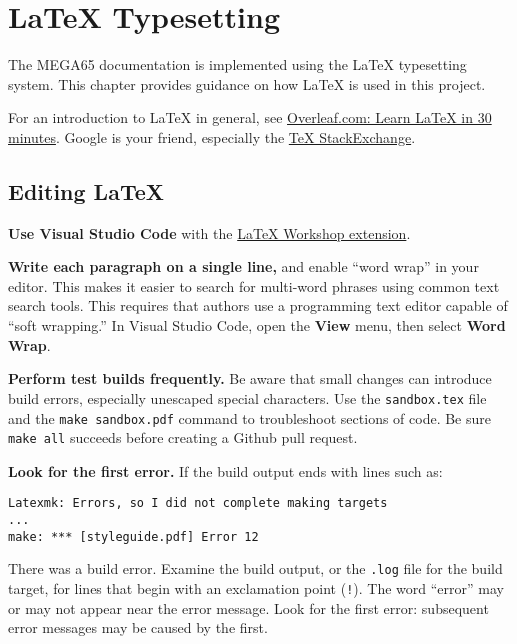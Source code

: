 
\chapter{LaTeX Typesetting}

The MEGA65 documentation is implemented using the LaTeX typesetting system. This chapter provides guidance on how LaTeX is used in this project.

For an introduction to LaTeX in general, see \href{https://www.overleaf.com/learn/latex/Learn_LaTeX_in_30_minutes}{Overleaf.com: Learn LaTeX in 30 minutes}. Google is your friend, especially the \href{https://tex.stackexchange.com/}{TeX StackExchange}.

\section{Editing LaTeX}

\textbf{Use Visual Studio Code} with the \href{https://marketplace.visualstudio.com/items?itemName=James-Yu.latex-workshop}{LaTeX Workshop extension}.

\textbf{Write each paragraph on a single line,} and enable ``word wrap'' in your editor. This makes it easier to search for multi-word phrases using common text search tools. This requires that authors use a programming text editor capable of ``soft wrapping.'' In Visual Studio Code, open the \textbf{View} menu, then select \textbf{Word Wrap}.

\textbf{Perform test builds frequently.} Be aware that small changes can introduce build errors, especially unescaped special characters. Use the \texttt{sandbox.tex} file and the \texttt{make sandbox.pdf} command to troubleshoot sections of code. Be sure \texttt{make all} succeeds before creating a Github pull request.

\textbf{Look for the first error.} If the build output ends with lines such as:

\begin{verbatim}
Latexmk: Errors, so I did not complete making targets
...
make: *** [styleguide.pdf] Error 12
\end{verbatim}

There was a build error. Examine the build output, or the \texttt{.log} file for the build target, for lines that begin with an exclamation point (\texttt{!}). The word ``error'' may or may not appear near the error message. Look for the first error: subsequent error messages may be caused by the first.

